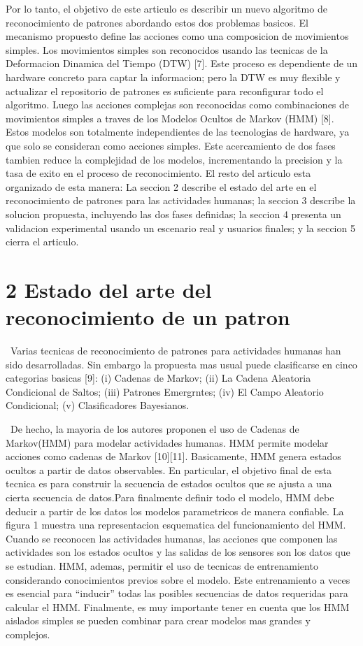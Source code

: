 \documentclass{paper}
\begin{document}
Por lo tanto, el objetivo de este articulo es describir un nuevo algoritmo de reconocimiento de patrones abordando estos dos problemas basicos. El mecanismo propuesto define las acciones como una composicion de movimientos simples. Los movimientos simples son reconocidos usando las tecnicas de la Deformacion Dinamica del Tiempo (DTW) [7]. Este proceso es dependiente de un hardware concreto para captar la informacion; pero la DTW es muy flexible y actualizar el repositorio de patrones es suficiente para reconfigurar todo el algoritmo. Luego las acciones complejas son reconocidas como combinaciones de movimientos simples a traves de los Modelos Ocultos de Markov (HMM) [8]. Estos modelos son totalmente independientes de las tecnologias de hardware, ya que solo se consideran como acciones simples. Este acercamiento de dos fases tambien reduce la complejidad de los modelos, incrementando la precision y la tasa de exito en el proceso de reconocimiento.
El resto del articulo esta organizado de esta manera: La seccion 2 describe el estado del arte en el reconocimiento de patrones para las actividades humanas; la seccion 3 describe la solucion propuesta, incluyendo las dos fases definidas; la seccion 4 presenta un validacion experimental usando un escenario real y usuarios finales; y la seccion 5 cierra el articulo.


\section*{2  Estado del arte del reconocimiento de un patron}
\ Varias tecnicas de reconocimiento de patrones para actividades humanas han sido desarrolladas. Sin embargo la propuesta mas usual puede clasificarse en cinco categorias basicas [9]: (i) Cadenas de Markov; (ii) La Cadena Aleatoria 
Condicional de Saltos; (iii) Patrones Emergrntes; (iv) El Campo Aleatorio Condicional; (v) Clasificadores Bayesianos.

\ De hecho, la mayoria de los autores proponen el uso de Cadenas de Markov(HMM) para modelar actividades humanas.
      HMM permite modelar acciones como cadenas de Markov [10][11]. Basicamente,
HMM genera estados ocultos a partir de datos observables.
En particular, el objetivo final de
esta tecnica es para construir la secuencia de estados ocultos que se ajusta a una cierta secuencia de datos.Para finalmente definir todo el modelo, HMM debe deducir a partir de los datos los modelos parametricos de manera confiable. La figura 1  muestra una representacion esquematica del funcionamiento del HMM. Cuando se reconocen las actividades humanas, las acciones que componen las actividades son los estados ocultos y las salidas de los sensores son los datos que se estudian. HMM, ademas, permitir el uso de tecnicas de entrenamiento considerando conocimientos previos sobre el modelo. Este entrenamiento a veces es esencial para “inducir” todas las posibles secuencias de datos requeridas para calcular el HMM. Finalmente, es muy importante tener en cuenta que los HMM aislados simples se pueden combinar para crear modelos mas grandes y complejos.
\end{document}
